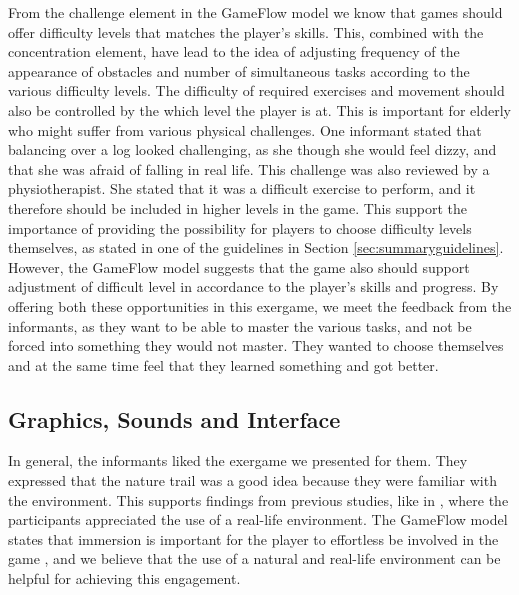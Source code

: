 From the challenge element in the GameFlow model we know that games should offer difficulty levels that matches the player's skills. This, combined with the concentration element, have lead to the idea of adjusting frequency of the appearance of obstacles and number of simultaneous tasks according to the various difficulty levels. The difficulty of required exercises and movement should also be controlled by the which level the player is at. This is important for elderly who might suffer from various physical challenges. One informant stated that balancing over a log looked challenging, as she though she would feel dizzy, and that she was afraid of falling in real life. This challenge was also reviewed by a physiotherapist. She stated that it was a difficult exercise to perform, and it therefore should be included in higher levels in the game. This support the importance of providing the possibility for players to choose difficulty levels themselves, as stated in one of the guidelines in Section \ref{sec:summaryguidelines}. However, the GameFlow model suggests that the game also should support adjustment of difficult level in accordance to the player's skills and progress. By offering both these opportunities in this exergame, we meet the feedback from the informants, as they want to be able to master the various tasks, and not be forced into something they would not master. They wanted to choose themselves and at the same time feel that they learned something and got better.


\subsection{Graphics, Sounds and Interface}

In general, the informants liked the exergame we presented for them. They expressed that the nature trail was a good idea because they were familiar with the environment. This supports findings from previous studies, like in \cite{gerling2}, where the participants appreciated the use of a real-life environment. The GameFlow model states that immersion is important for the player to effortless be involved in the game \cite{sweetser}, and we believe that the use of a natural and real-life environment can be helpful for achieving this engagement. 

